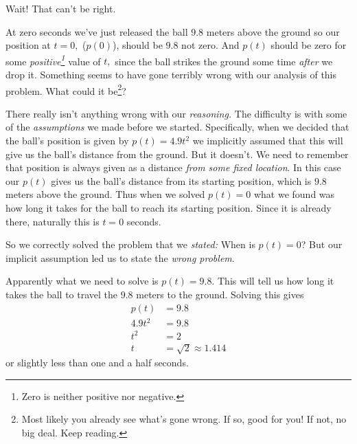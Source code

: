 \alert{Wait!} That can't be right.

At zero seconds we've just released the ball $9.8$ meters above the
ground so our position at $t=0,$ ($p(0)$), should be $9.8$ not
zero. And $p(t)$ should be zero for some \emph{positive\footnote{Zero
    is neither positive nor negative.}} value of $t,$ since the ball
strikes the ground some time \emph{after} we drop it.  Something seems
to have gone terribly wrong with our analysis of this problem. What
could it be\footnote{Most likely you already see what's gone wrong. If
  so, good for you! If not, no big deal. Keep reading.}?

There really isn't anything wrong with our \emph{reasoning.} The
difficulty is with some of the \emph{assumptions} we made before we
started.  Specifically, when we decided that the ball's position is
given by $p(t)=4.9t^2$ we implicitly assumed that this will give us
the ball's distance from the ground. But it doesn't. We need to
remember that position is always given as a distance \emph{from some
  fixed location}. In this case our $p(t)$ gives us the ball's
distance from its starting position, which is $9.8$ meters above the
ground. Thus when we solved $p(t)=0$ what we found was how long it
takes for the ball to reach its starting position. Since it is already
there, naturally this is $t=0$ seconds.

So we correctly solved the problem that we \emph{stated:} When is
$p(t)=0$? But our implicit assumption led us to state the \emph{wrong
  problem}.

Apparently what we need to solve is $p(t)=9.8.$ This will tell us how
long it takes the ball to travel the $9.8$ meters to the
ground. Solving this gives
\begin{align*}
  p(t) &= 9.8\\
  4.9t^2&=9.8\\
  t^2&=2\\
  t&=\sqrt{2}\approx 1.414
\end{align*}
or slightly less than one and a half seconds.

